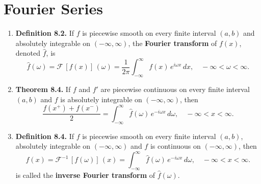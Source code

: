 \newpage

\section{Fourier Series}

\begin{enumerate}


\item \textbf{Definition 8.2.} If $f$ is piecewise smooth on every finite interval $(a, b)$ and absolutely integrable on $(-\infty, \infty)$, the \textbf{Fourier transform} of $f(x)$, denoted $\widehat{f}$, is
\[\widehat{f}(\omega) = \mathcal{F} \, [f(x)] \,(\omega) =  \frac{1}{2\pi} \int_{-\infty} ^{\infty}f(x) \,e^{i\omega x} \,dx, \quad -\infty < \omega <\infty.\]


\item \textbf{Theorem 8.4.} If $f$ and $f'$ are piecewise continuous on every finite interval $(a, b)$ and $f$ is absolutely integrable on $(-\infty, \infty)$, then
\[\frac{f(x^{+})+f(x^{-})}{2} = \int_{-\infty}^{\infty}\widehat{f}(\omega)\, e^{-i\omega x}\, d\omega, \quad -\infty <x<\infty.\]

\item \textbf{Definition 8.4.} If $f$ is piecewise smooth on every finite interval $(a, b)$, absolutely integrable on $(-\infty, \infty)$ and $f$ is continuous on $(-\infty, \infty)$, then 
\[{f}(x) = \mathcal{F}^{-1} \, [f(\omega)] \,(x) =  \int_{-\infty} ^{\infty}\widehat{f}(\omega) \,e^{-i\omega x} \,d\omega, \quad -\infty < x <\infty.\]
is called the \textbf{inverse Fourier transform} of $\widehat{f} (\omega)$.


\end{enumerate}
